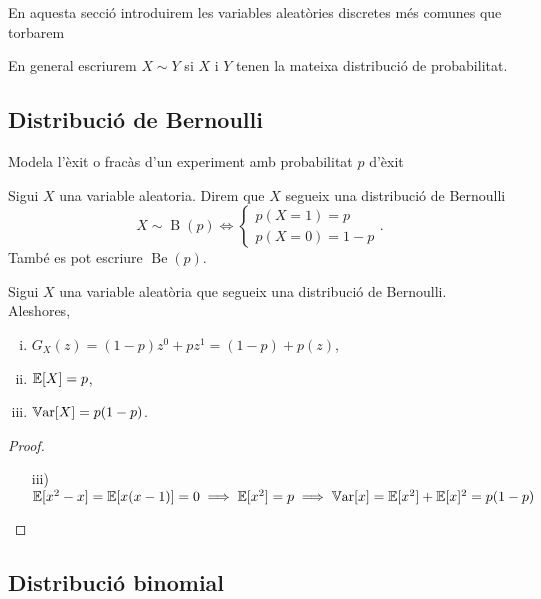 En aquesta secció introduirem les variables aleatòries discretes més comunes que torbarem

\begin{obs}
    En general escriurem $X \sim Y$ si $X$ i $Y$ tenen la mateixa distribució de probabilitat.
\end{obs}

\subsection*{Distribució de Bernoulli}

Modela l'èxit o fracàs d'un experiment amb probabilitat $p$ d'èxit

\begin{defi}
    Sigui $X$ una variable aleatoria. Direm que $X$ segueix una distribució de Bernoulli 
    \[X \sim \operatorname{B}(p) \iff \begin{cases}
                       p(X=1) = p \\
                       p(X=0) = 1-p
                       \end{cases}.
    \]
    També es pot escriure $\operatorname{Be}(p)$.
\end{defi}

\begin{prop}
    Sigui $X$ una variable aleatòria que segueix una distribució de Bernoulli. Aleshores,
    \begin{enumerate}[i)]
        \item $G_X(z) = (1-p)z^0 + pz^1 = (1-p) + p(z)$,
        \item $\operatorname{\mathbb{E}}[X] = p$,
        \item $\operatorname{\mathbb{V}ar}[X] = p(1-p)$.
    \end{enumerate}
\end{prop}

\begin{proof} %
    \begin{enumerate}[i)]
        \item[]
        \item[iii)] $\operatorname{\mathbb{E}}[x^2-x]= \operatorname{\mathbb{E}}[x(x-1)] = 0 \implies \operatorname{\mathbb{E}}[x^2] = p \implies \operatorname{\mathbb{V}ar}[x] = \operatorname{\mathbb{E}}[x^2] + \operatorname{\mathbb{E}}[x]^2
        = p(1-p)$
    \end{enumerate}
\end{proof}

\subsection*{Distribució binomial}

